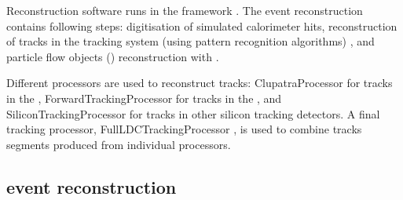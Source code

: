 Reconstruction software runs in the \Marlin framework \cite{Gaede:2006pj}. The event reconstruction contains following steps: digitisation of simulated calorimeter hits, reconstruction of tracks in the tracking system (using pattern recognition algorithms) \cite{Gaede:2014aza}, and particle flow objects (\PFOs) reconstruction with \pandora\cite{Thomson:2009rp,Marshall:2012ry}.


Different \Marlin processors are used to reconstruct tracks: ClupatraProcessor \cite{Gaede:2014aza} for tracks in the \TPC, ForwardTrackingProcessor \cite{Gaede:2014aza} for tracks in the \FTD, and SiliconTrackingProcessor \cite{Gaede:2014aza} for tracks in other silicon tracking detectors. A final \Marlin tracking processor, FullLDCTrackingProcessor \cite{Gaede:2014aza}, is used to combine tracks segments produced from individual processors.



\subsection{\pandora event reconstruction}
\label{sec:pandoraPandoraPFA}


